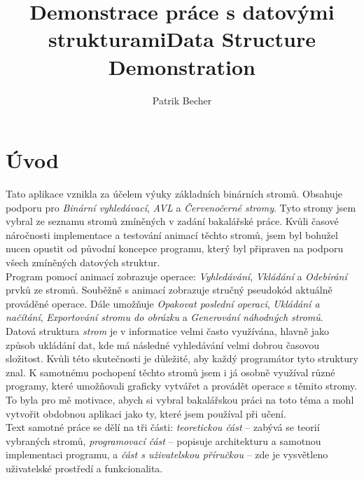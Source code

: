 \documentclass[
  biblatex=false,
  font=serif,
  glossaries=false,
  tables=false,
  theorems=false,
  index
]{kidiplom}
\title{Demonstrace práce s datovými strukturami}
\title[english]{Data Structure Demonstration}
\author{Patrik Becher}
\begin{document}


\maketitle



\section{Úvod}
\indent\indent Tato aplikace vznikla za účelem výuky základních binárních stromů. Obsahuje podporu pro \textit{Binární vyhledávací}, \textit{AVL} a \textit{Červenočerné stromy}. Tyto stromy jsem vybral ze seznamu stromů zmíněných v zadání bakalářské práce. Kvůli časové náročnosti implementace a testování animací těchto stromů, jsem byl bohužel nucen opustit od původní koncepce programu, který byl připraven na podporu všech zmíněných datových struktur.\\
\indent Program pomocí animací zobrazuje operace: \textit{Vyhledávání}, \textit{Vkládání} a \textit{Odebírání} prvků ze stromů. Souběžně s animací zobrazuje stručný pseudokód aktuálně prováděné operace. Dále umožňuje \textit{Opakovat poslední operaci}, \textit{Ukládání a načítání}, \textit{Exportování stromu do obrázku} a \textit{Generování náhodných stromů}.\\
\indent Datová struktura \textit{strom} je v informatice velmi často využívána, hlavně jako způsob ukládání dat, kde má následné vyhledávání velmi dobrou časovou složitost. Kvůli této skutečnosti je důležité, aby každý programátor tyto struktury znal. K samotnému pochopení těchto stromů jsem i já osobně využíval různé programy, které umožňovali graficky vytvářet a provádět operace s těmito stromy. To byla pro mě motivace, abych si vybral bakalářskou práci na toto téma a mohl vytvořit obdobnou aplikaci jako ty, které jsem používal při učení. \\
\indent Text samotné práce se dělí na tři části: \textit{teoretickou část} -- zabývá se teorií vybraných stromů, \textit{programovací část} -- popisuje architekturu a samotnou implementaci programu, a \textit{část s uživatelskou příručkou} --  zde je vysvětleno uživatelské prostředí a funkcionalita.\\
\newpage
\end{document}
